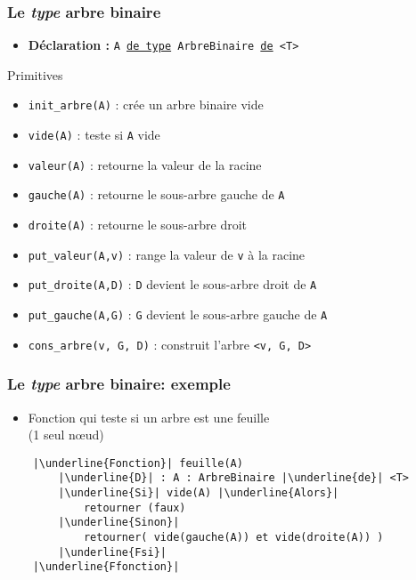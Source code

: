 \documentclass[table,handout,tikz,12pt,svgnames]{beamer}
\begin{document}
\begin{frame}[fragile=singleslide]
	\frametitle{Le \textit{type} arbre binaire}
	\vspace{-1em}
	\begin{block}{} %
		\begin{itemize}
			\item \textbf{Déclaration :} \texttt{A \underline{de type} ArbreBinaire \underline{de} <T>}
		\end{itemize}
	\end{block}
	\begin{block}{Primitives}
		\begin{itemize}%
			\item \texttt{init\_arbre(A)} : crée un arbre binaire vide
			\item \texttt{vide(A)} : teste si \texttt{A} vide
			\item \texttt{valeur(A)} : retourne la valeur de la racine
			\item \texttt{gauche(A)} : retourne le sous-arbre gauche de \texttt{A}
			\item \texttt{droite(A)} : retourne le sous-arbre droit
			\item \texttt{put\_valeur(A,v)} : range la valeur de \texttt{v} à la racine
			\item \texttt{put\_droite(A,D)} : \texttt{D} devient le sous-­arbre droit de \texttt{A}
			\item \texttt{put\_gauche(A,G)} : \texttt{G} devient le sous-arbre gauche de \texttt{A}
			\item \texttt{cons\_arbre(v, G, D)} : construit l'arbre \texttt{<v, G, D>}
		\end{itemize}
	\end{block}
\end{frame}


\begin{frame}[fragile=singleslide]
	\frametitle{Le \textit{type} arbre binaire: exemple}
	\begin{block}{} %
		\begin{itemize}
			\item Fonction qui teste si un arbre est une feuille\\(1 seul nœud)
		\end{itemize}
	\end{block}
	\begin{block}{}
		\begin{verbatim}
	|\underline{Fonction}| feuille(A)
		|\underline{D}| : A : ArbreBinaire |\underline{de}| <T>
		|\underline{Si}| vide(A) |\underline{Alors}|
			retourner (faux)
		|\underline{Sinon}|
			retourner( vide(gauche(A)) et vide(droite(A)) )
		|\underline{Fsi}|
	|\underline{Ffonction}|
		\end{verbatim}
	\end{block}
\end{frame}
\end{document}

